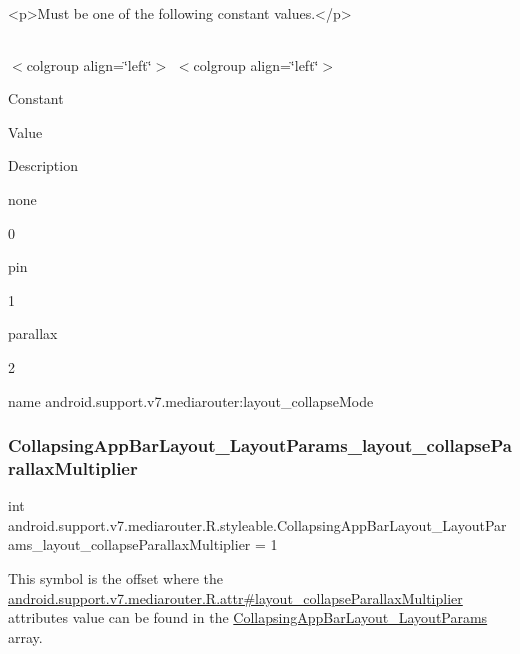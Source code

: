 \begin{DoxyVerb}      <p>Must be one of the following constant values.</p>
\end{DoxyVerb}
 \tabulinesep=1mm
\begin{longtabu} spread 0pt [c]{*{0}{|X[-1]}|}
\hline
\end{longtabu}
$<$colgroup align=\char`\"{}left\char`\"{}$>$ $<$colgroup align=\char`\"{}left\char`\"{}$>$ 

Constant

Value

Description 

{\ttfamily none}

0

{\ttfamily pin}

1

{\ttfamily parallax}

2

name android.\+support.\+v7.\+mediarouter\+:layout\+\_\+collapse\+Mode \mbox{\label{classandroid_1_1support_1_1v7_1_1mediarouter_1_1R_1_1styleable_a19d2f8a3ce6aef7ab8239ffeffe31018}} 
\subsubsection{\texorpdfstring{Collapsing\+App\+Bar\+Layout\+\_\+\+Layout\+Params\+\_\+layout\+\_\+collapse\+Parallax\+Multiplier}{CollapsingAppBarLayout\_LayoutParams\_layout\_collapseParallaxMultiplier}}
{\footnotesize\ttfamily int android.\+support.\+v7.\+mediarouter.\+R.\+styleable.\+Collapsing\+App\+Bar\+Layout\+\_\+\+Layout\+Params\+\_\+layout\+\_\+collapse\+Parallax\+Multiplier = 1\hspace{0.3cm}{\ttfamily [static]}}

This symbol is the offset where the \hyperlink{classandroid_1_1support_1_1v7_1_1mediarouter_1_1R_1_1attr_afb850e29005e17531a195a97798099f2}{android.\+support.\+v7.\+mediarouter.\+R.\+attr\#layout\+\_\+collapse\+Parallax\+Multiplier} attribute\textquotesingle{}s value can be found in the \hyperlink{classandroid_1_1support_1_1v7_1_1mediarouter_1_1R_1_1styleable_a3a8fc0e8f0991d8f2645deeb9a8cfbb6}{Collapsing\+App\+Bar\+Layout\+\_\+\+Layout\+Params} array.

